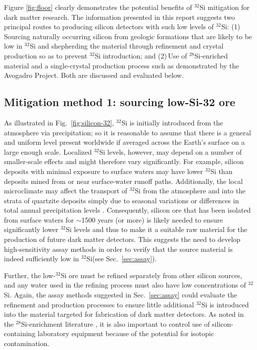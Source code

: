 \documentclass[final,5p]{elsarticle}
\def\si{$^{32}$Si\xspace}
\def\esi{$^{28}$Si\xspace}
\begin{document}
Figure \ref{fig:floor} clearly demonstrates the potential benefits of \si mitigation for dark matter research. The information presented in this report suggests two principal routes to producing silicon detectors with such low levels of \si: (1)\,Sourcing naturally occurring silicon from geologic formations that are likely to be low in \si and shepherding the material through refinement and crystal production so as to prevent \si introduction; and (2)\,Use of \esi-enriched material and a single-crystal production process such as demonstrated by the Avogadro Project. Both are discussed and evaluated below.

\subsection{Mitigation method 1: sourcing low-Si-32 ore}\label{ssec:mitigation1}
As illustrated in Fig.\ \ref{fig:silicon-32}, \si is initially introduced from the atmosphere via precipitation; so it is reasonable to assume that there is a general and uniform level present worldwide if averaged across the Earth's surface on a large enough scale. Localized \si levels, however, may depend on a number of smaller-scale effects and might therefore vary significantly.  For example, silicon deposits with minimal exposure to surface waters may have lower \si than deposits mined from or near surface-water runoff paths. Additionally, the local microclimate may affect the transport of \si from the atmosphere and into the strata of quartzite deposits simply due to seasonal variations or differences in total annual precipitation levels \cite{MORGENSTERN3}. Consequently, silicon ore that has been isolated from surface waters for $\sim$1500 years (or more) is likely needed to ensure significantly lower \si levels and thus to make it a suitable raw material for the production of future dark matter detectors. This suggests the need to develop high-sensitivity assay methods in order to verify that the source material is indeed sufficiently low in \si (see Sec.\ \ref{sec:assay}).

Further, the low-\si ore must be refined separately from other silicon sources, and any water used in the refining process must also have low concentrations of \si. Again, the assay methods suggested in Sec.\ \ref{sec:assay} could evaluate the refinement and production processes to ensure little additional \si is introduced into the material targeted for fabrication of dark matter detectors. As noted in the \esi-enrichment literature \cite{inkret}, it is also important to control use of silicon-containing laboratory equipment because of the potential for isotopic contamination. 
\end{document}

